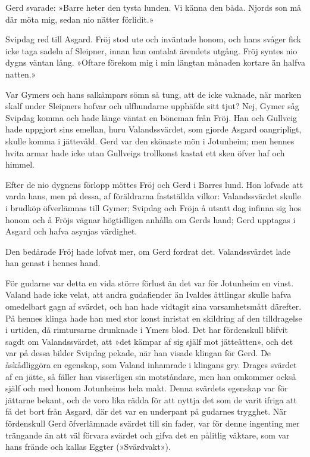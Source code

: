 Gerd svarade: »Barre heter den tysta lunden. Vi känna den båda. Njords
son må där möta mig, sedan nio nätter förlidit.»

Svipdag red till Asgard. Fröj stod ute och inväntade honom, och hans
svåger fick icke taga sadeln af Sleipner, innan han omtalat ärendets
utgång. Fröj syntes nio dygns väntan lång. »Oftare förekom mig i min
längtan månaden kortare än halfva natten.»

Var Gymers och hans salkämpars sömn så tung, att de icke vaknade, när
marken skalf under Sleipners hofvar och ulfhundarne upphäfde sitt tjut?
Nej, Gymer såg Svipdag komma och hade länge väntat en böneman från Fröj.
Han och Gullveig hade uppgjort sins emellan, huru Valandssvärdet, som
gjorde Asgard oangripligt, skulle komma i jättevåld. Gerd var den
skönaste mön i Jotunheim; men hennes hvita armar
\protect\hypertarget{lb1625905.xhtmlux5cux23start136}{}{}\protect\hypertarget{lb1625905.xhtmlux5cux23start136-a}{}{}\protect\hypertarget{lb1625905.xhtmlux5cux23start136-b}{}{}\protect\hypertarget{lb1625905.xhtmlux5cux23start136-c}{}{}\protect\hypertarget{lb1625905.xhtmlux5cux23start136-d}{}{}
hade icke utan Gullveigs trollkonst kastat ett sken öfver haf och
himmel.

Efter de nio dygnens förlopp möttes Fröj och Gerd i Barres lund. Hon
lofvade att varda hans, men på dessa, af föräldrarna fastställda vilkor:
Valandssvärdet skulle i brudköp öfverlämnas till Gymer; Svipdag och
Fröja å utsatt dag infinna sig hos honom och å Fröjs vägnar högtidligen
anhålla om Gerds hand; Gerd upptagas i Asgard och hafva asynjas
värdighet.

Den bedårade Fröj hade lofvat mer, om Gerd fordrat det. Valandssvärdet
lade han genast i hennes hand.

För gudarne var detta en vida större förlust än det var för Jotunheim en
vinst. Valand hade icke velat, att andra gudafiender än Ivaldes
ättlingar skulle hafva omedelbart gagn af svärdet, och han hade vidtagit
sina varsamhetsmått därefter. På hennes klinga hade han med stor konst
inristat en skildring af den tilldragelse i urtiden, då rimtursarne
drunknade i Ymers blod. Det har fördenskull blifvit sagdt om
Valandssvärdet, att »det kämpar af sig själf mot jätteätten», och det
var på dessa bilder Svipdag pekade, när han visade klingan för Gerd. De
åskådliggöra en egenskap, som Valand inhamrade i klingans gry. Drages
svärdet af en jätte, så fäller han visserligen sin motståndare, men han
omkommer också själf och med honom Jotunheims hela makt. Denna svärdets
egenskap var för jättarne bekant, och de voro lika rädda för att nyttja
det som de varit ifriga att få det bort från Asgard, där det var en
underpant på gudarnes trygghet. När fördenskull Gerd öfverlämnade
svärdet till sin fader, var för denne ingenting mer trängande än att väl
förvara svärdet och gifva det en pålitlig väktare, som var hans frände
och kallas Eggter (»Svärdvakt»).

